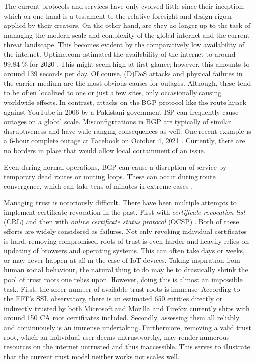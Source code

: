 \documentclass[../eva1_scion.tex]{subfiles}
\begin{document}
    The current protocols and services have only evolved little since their inception, which on one hand is a testament to the relative foresight and design rigour applied by their creators. On the other hand, are they no longer up to the task of managing the modern scale and complexity of the global internet and the current threat landscape. This becomes evident by the comparatively low availability of the internet. Uptime.com estimated the availability of the internet to around 99.84 \% for 2020 \cite{internet_availability}. This might seem high at first glance; however, this amounts to around 139 seconds per day. Of course, (D)DoS attacks and physical failures in the carrier medium are the most obvious causes for outages. Although, these tend to be often localized to one or just a few sites, only occasionally causing worldwide effects. In contrast, attacks on the BGP protocol like the route hijack against YouTube in 2006  by a Pakistani government ISP  \cite{youtube_hijack} can frequently cause outages on a global scale. Misconfigurations in BGP are typically of similar disruptiveness and have wide-ranging consequences as well. One recent example is a 6-hour complete outage at Facebook on October 4, 2021 \cite{facebook_oups}. Currently, there are no borders in place that would allow local containment of an issue.

    Even during normal operations, BGP can cause a disruption of service by temporary dead routes or routing loops. These can occur during route convergence, which can take tens of minutes in extreme cases \cite{route_convergence}.

    Managing trust is notoriously difficult. There have been multiple attempts to implement certificate revocation in the past. First with \textit{certificate revocation list} (CRL) \cite{rfc_crl} and then with \textit{online certificate status protocol} (OCSP) \cite{rfc_ocsp}. Both of these efforts are widely considered as failures. Not only revoking individual certificates is hard, removing compromised roots of trust is even harder and heavily relies on updating of browsers and operating systems. This can often take days or weeks, or may never happen at all in the case of IoT devices. Taking inspiration from human social behaviour, the natural thing to do may be to  drastically shrink the pool of trust roots one relies upon. However, doing this is almost an impossible task. First, the sheer number of available trust roots is immense. According to the EFF's SSL observatory, there is an estimated 650 \cite{trusted_entities} entities directly or indirectly trusted by both Microsoft and Mozilla and Firefox currently ships with around 150 CA root certificates included. Secondly, assessing them all reliably and continuously is an immense undertaking. Furthermore, removing a valid trust root, which an individual user deems untrustworthy, may render numerous resources on the internet untrusted and thus inaccessible. This serves to illustrate that the current trust model neither works nor  scales well.
\end{document}
